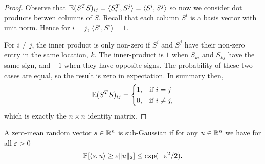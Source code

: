\begin{proof}
Observe that $\mathbb{E}(S^T S)_{ij} = \langle S^T_i, S^j \rangle = \langle S^i, S^j
\rangle$ so now we consider dot products betwen columns of $S$.
Recall that each column $S^i$ is a basis vector with unit norm. 
Hence for $i=j$, $\langle S^i, S^i \rangle = 1$.

For $i\neq j$, the inner product is only non-zero if $S^i$ and $S^j$
have their non-zero entry in the same location, $k$.
The inner-product is $1$ when $S_{ki}$ and $S_{kj}$ have the same sign,
and $-1$ when they have opposite signs.
The probability of these two cases are equal, so the result is zero in
expectation. 
In summary then, 
  \begin{equation*}
    \mathbb{E} (S^T S)_{ij} =
    \begin{cases}
      1, & \text{if}\ i = j \\
      0, & \text{if}\ i \ne j, \\
    \end{cases}
  \end{equation*}
  which is exactly the $n \times n$ identity matrix.

\end{proof}





\begin{mydef}
  A zero-mean random vector $s \in \mathbb{R}^n$ is sub-Gaussian if for any $u \in \mathbb{R}^n$
  we have for all $\varepsilon > 0$
  \begin{equation}
    \mathbb{P} [ \langle s, u \rangle \ge \varepsilon \| u \|_2 ] \le \exp(-\varepsilon^2/2).
  \end{equation}
\end{mydef}



